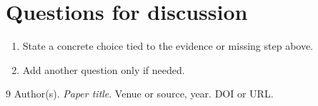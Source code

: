 \documentclass[11pt]{article}
\begin{document}
\section{Questions for discussion}
\begin{enumerate}[leftmargin=*]
  \item State a concrete choice tied to the evidence or missing step above.
  \item Add another question only if needed.
\end{enumerate}

\begin{thebibliography}{9}
 Author(s). \emph{Paper title}. Venue or source, year. DOI or URL.
\end{thebibliography}
\end{document}
